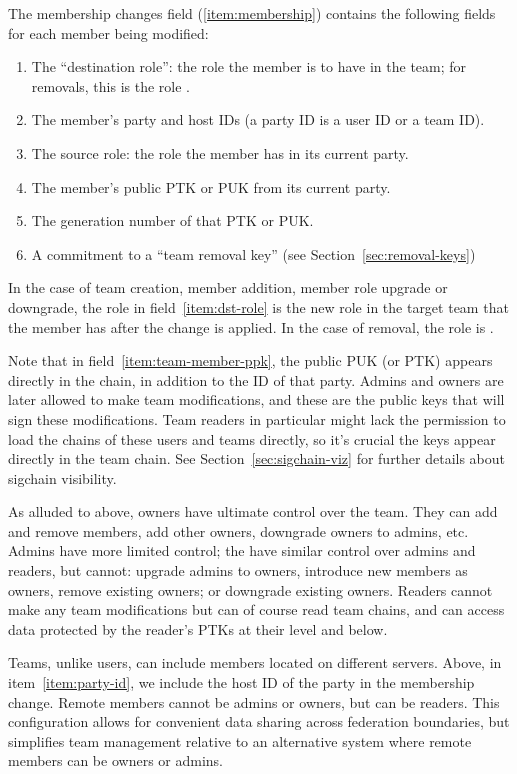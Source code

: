 The membership changes field (\ref{item:membership}) contains the following
fields for each member being modified:

\begin{enumerate}[label=M.\arabic*]\itemsep0em
    \item The ``destination role'': the role the member is to have in the team; for removals,
      this is the role \none .
      \label{item:dst-role}
    \item The member's party and host IDs (a party ID is a user ID or a team ID).
      \label{item:party-id}
    \item The source role: the role the member has in its current party.
    \item The member's public PTK or PUK from its current party.
      \label{item:team-member-ppk}
    \item The generation number of that PTK or PUK.
    \item A commitment to a ``team removal key'' (see Section~\ref{sec:removal-keys})
\end{enumerate}

In the case of team creation, member addition, member role upgrade or downgrade, the
role in field~\ref{item:dst-role} is the new role in the target team that the member
has after the change is applied.  In the case of removal, the role is \none. 

Note that in field~\ref{item:team-member-ppk}, the public PUK (or PTK) appears directly
in the chain, in addition to the ID of that party. Admins and owners are later allowed to
make team modifications, and these are the public keys that will sign these modifications.
Team readers in particular might lack the permission to load the chains of these users
and teams directly, so it's crucial the keys appear directly in the team chain. 
See Section~\ref{sec:sigchain-viz} for further details about sigchain visibility.

As alluded to above, owners have ultimate control over the team. They can add and remove
members, add other owners, downgrade owners to admins, etc. Admins have more limited 
control; the have similar control over admins and readers, but cannot: upgrade admins
to owners, introduce new members as owners, remove existing owners; or downgrade 
existing owners. Readers cannot make any team modifications but can of course read
team chains, and can access data protected by the reader's PTKs at their level
and below.

Teams, unlike users, can include members located on different servers. Above, in 
item~\ref{item:party-id}, we include the host ID of the party in the membership change.
Remote members cannot be admins or owners, but can be readers. This configuration allows
for convenient data sharing across federation boundaries, but simplifies team management
relative to an alternative system where remote members can be owners or admins.


